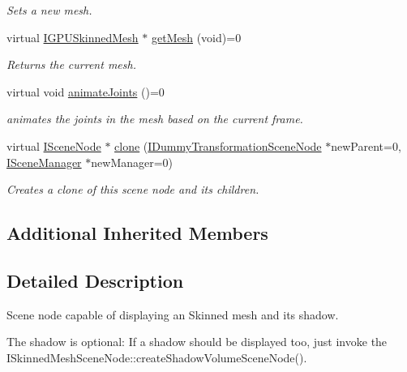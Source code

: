 \begin{DoxyCompactItemize}
\begin{DoxyCompactList}\small\item\em Sets a new mesh. \end{DoxyCompactList}\item 
virtual \hyperlink{classirr_1_1scene_1_1IGPUSkinnedMesh}{I\+G\+P\+U\+Skinned\+Mesh} $\ast$ \hyperlink{classirr_1_1scene_1_1ISkinnedMeshSceneNode_a7a8dba15a9dd83b733282e8acbb3cdea}{get\+Mesh} (void)=0\hypertarget{classirr_1_1scene_1_1ISkinnedMeshSceneNode_a7a8dba15a9dd83b733282e8acbb3cdea}{}\label{classirr_1_1scene_1_1ISkinnedMeshSceneNode_a7a8dba15a9dd83b733282e8acbb3cdea}

\begin{DoxyCompactList}\small\item\em Returns the current mesh. \end{DoxyCompactList}\item 
virtual void \hyperlink{classirr_1_1scene_1_1ISkinnedMeshSceneNode_a64990a5ca347edafa131ccd0e4d60b8b}{animate\+Joints} ()=0
\begin{DoxyCompactList}\small\item\em animates the joints in the mesh based on the current frame. \end{DoxyCompactList}\item 
virtual \hyperlink{classirr_1_1scene_1_1ISceneNode}{I\+Scene\+Node} $\ast$ \hyperlink{classirr_1_1scene_1_1ISkinnedMeshSceneNode_ad77d0172fd48b2f531acc734bc6a2d16}{clone} (\hyperlink{classirr_1_1scene_1_1IDummyTransformationSceneNode}{I\+Dummy\+Transformation\+Scene\+Node} $\ast$new\+Parent=0, \hyperlink{classirr_1_1scene_1_1ISceneManager}{I\+Scene\+Manager} $\ast$new\+Manager=0)
\begin{DoxyCompactList}\small\item\em Creates a clone of this scene node and its children. \end{DoxyCompactList}\end{DoxyCompactItemize}
\subsection*{Additional Inherited Members}


\subsection{Detailed Description}
Scene node capable of displaying an Skinned mesh and its shadow. 

The shadow is optional\+: If a shadow should be displayed too, just invoke the I\+Skinned\+Mesh\+Scene\+Node\+::create\+Shadow\+Volume\+Scene\+Node(). 

